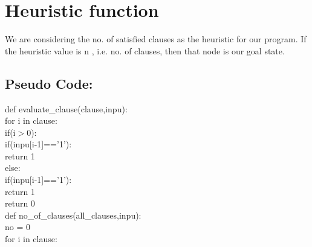 \documentclass{article}
\begin{document}
\section{Heuristic function}
\vspace{10pt}
We are considering the no. of satisfied clauses as the heuristic for our program.
If the heuristic value is n , i.e. no. of clauses, then that node is our goal state.
\subsection*{Pseudo Code:}
\vspace{5pt}
    def evaluate\_clause(clause,inpu):
        \vspace{2pt}
        \\ \hspace*{20pt}for i in clause:
        \vspace{2pt}
        \\ \hspace*{30pt}if(i$>$0):
        \vspace{2pt}
        \\ \hspace*{50pt} if(inpu[i-1]=='1'):
        \vspace{2pt}
        \\ \hspace*{70pt} return 1
        \vspace{2pt}
        \\ \hspace*{30pt} else:
        \vspace{2pt}
        \\ \hspace*{50pt} if(inpu[i-1]=='1'):
        \vspace{2pt}
        \\ \hspace*{70pt} return 1
        \vspace{2pt}
        \\ \hspace*{20pt} return 0
\vspace{15pt}
        \\def no\_of\_clauses(all\_clauses,inpu):
            \vspace{2pt}
            \\ \hspace*{20pt}no = 0
            \vspace{2pt}
            \\ \hspace*{20pt}for i in clause:
\end{document}

